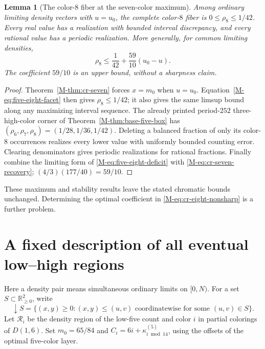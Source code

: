 \documentclass[11pt,reqno]{amsart}
\theoremstyle{plain}
\newtheorem{lemma}[theorem]{Lemma}
\newcommand{\D}[1]{D(1,#1)}
\theoremstyle{plain}
\theoremstyle{plain}
\begin{document}
\begin{lemma}[The color-$8$ fiber at the seven-color maximum]
\label{M-lem:cr-optimal-eight}
Among ordinary limiting density vectors with $u=u_0$, the complete
color-$8$ fiber is $0\le\rho_8\le1/42$. Every real value has a
realization with bounded interval discrepancy, and every rational
value has a periodic realization. More generally, for common limiting
densities,
\begin{equation}\label{M-eq:cr-eight-nonsharp}
 \rho_8\le\frac1{42}+\frac{59}{10}(u_0-u).
\end{equation}
The coefficient $59/10$ is an upper bound, without a sharpness claim.
\end{lemma}
\begin{proof}
Theorem~\ref{M-thm:cr-seven} forces $x=m_0$ when $u=u_0$.
Equation~\eqref{M-eq:five-eight-facet} then gives $\rho_8\le1/42$;
it also gives the same limsup bound along any maximizing interval
sequence. The already printed period-$252$ three-high-color corner
of Theorem~\ref{M-thm:base-five-box} has
$(\rho_6,\rho_7,\rho_8)=(1/28,1/36,1/42)$. Deleting a balanced
fraction of only its color-$8$ occurrences realizes every lower
value with uniformly bounded counting error. Clearing denominators
gives periodic realizations for rational fractions. Finally combine
the limiting form of \eqref{M-eq:five-eight-deficit} with
\eqref{M-eq:cr-seven-recovery}; $(4/3)(177/40)=59/10$.
\end{proof}

These maximum and stability results leave the stated chromatic bounds
unchanged. Determining the optimal coefficient in
\eqref{M-eq:cr-eight-nonsharp} is a further problem.

\section{A fixed description of all eventual low--high regions}
\label{M-sec:eventual-high-regions}

Here a density pair means simultaneous ordinary limits on $[0,N)$.
For a set $S\subset\mathbb R_{\ge0}^2$, write
\[
\downarrow S=\{(x,y)\ge0:(x,y)\le(u,v)
\text{ coordinatewise for some }(u,v)\in S\}.
\]
Let $\mathcal R_i$ be the density region of the low-five count and color
$i$ in partial colorings of $\D{6}$. Set $m_0=65/84$ and
$C_i=6i+\kappa^{(5)}_{i\bmod14}$, using the offsets of the optimal five-color layer.
\end{document}
